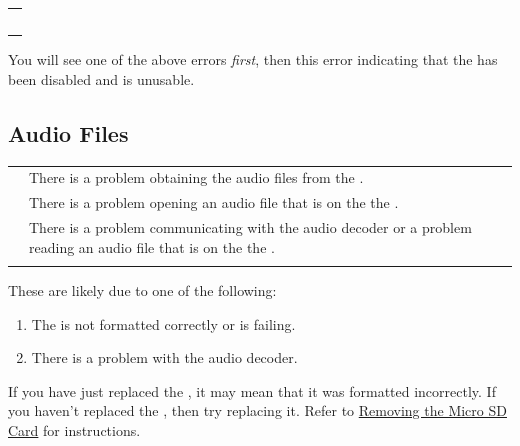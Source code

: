 \begin{table}[H]
\centering
\begin{tabu}{c}
    \\
    \\
    \\
    \\
    \\
\end{tabu}
\end{table}

You will see one of the above errors \textit{first}, then this error indicating
that the  has been disabled and is unusable.

\subsection{Audio Files}

\par\bigskip

\begin{table}[H]
\begin{tabu}{X[1,c,m] X[4,l,m]}
  \mrule
   
    & There is a problem obtaining the audio files from the . \\ 
   
    & There is a problem opening an audio file that is on the the . \\ 
   
    & There is a problem communicating with the audio decoder or a problem
      reading an audio file that is on the the . \\
  \mrule
\end{tabu}
\end{table}

These are likely due to one of the following:

\begin{enumerate}
  \item The  is not formatted correctly or is failing.
  \item There is a problem with the audio decoder.
\end{enumerate}

If you have just replaced the , it may mean that it was formatted
incorrectly.  If you haven't replaced the , then try replacing it.
Refer to \hyperref[Removing SD Card]{Removing the Micro SD Card} for
instructions.

